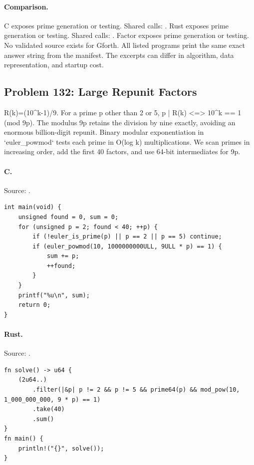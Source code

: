 \paragraph{Comparison.}
C exposes prime generation or testing. Shared calls: \texttt{}. Rust exposes prime generation or testing. Shared calls: \texttt{}. Factor exposes prime generation or testing.
No validated source exists for Gforth.
All listed programs print the same exact answer string from the manifest. The excerpts can differ in algorithm, data representation, and startup cost.

\subsection{Problem 132: Large Repunit Factors}
\label{walkthrough:p132}
R(k)=(10\textasciicircum{}k-1)/9. For a prime p other than 2 or 5, p | R(k) <=> 10\textasciicircum{}k == 1 (mod 9p). The modulus 9p retains the division by nine exactly, avoiding an enormous billion-digit repunit. Binary modular exponentiation in `euler\_powmod` tests each prime in O(log k) multiplications. We scan primes in increasing order, add the first 40 factors, and use 64-bit intermediates for 9p.

\paragraph{C.} Source: .
\begin{lstlisting}
int main(void) {
    unsigned found = 0, sum = 0;
    for (unsigned p = 2; found < 40; ++p) {
        if (!euler_is_prime(p) || p == 2 || p == 5) continue;
        if (euler_powmod(10, 1000000000ULL, 9ULL * p) == 1) {
            sum += p;
            ++found;
        }
    }
    printf("%u\n", sum);
    return 0;
}
\end{lstlisting}

\paragraph{Rust.} Source: .
\begin{lstlisting}
fn solve() -> u64 {
    (2u64..)
        .filter(|&p| p != 2 && p != 5 && prime64(p) && mod_pow(10, 1_000_000_000, 9 * p) == 1)
        .take(40)
        .sum()
}
fn main() {
    println!("{}", solve());
}
\end{lstlisting}

